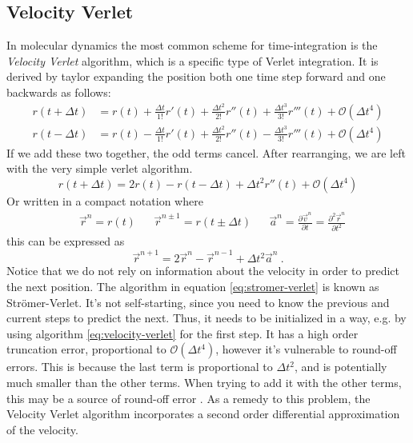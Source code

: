 \documentclass[twoside,english]{uiofysmaster}
\begin{document}
\subsection*{Velocity Verlet}
In molecular dynamics the most common scheme for time-integration is the \textit{Velocity Verlet} algorithm, which is a specific type of Verlet integration.
It is derived by taylor expanding the position both one time step forward and one backwards as follows: 
\begin{align}
	r(t+\Delta t) &= r(t) + \frac{\Delta t}{1!}r'(t) + \frac{\Delta t^2}{2!}r''(t) + \frac{\Delta t^3}{3!}r'''(t) + \mathcal{O}(\Delta t^4)\\[1ex]
	r(t-\Delta t) &= r(t) - \frac{\Delta t}{1!}r'(t) + \frac{\Delta t^2}{2!}r''(t) - \frac{\Delta t^3}{3!}r'''(t) + \mathcal{O}(\Delta t^4)
\end{align}
If we add these two together, the odd terms cancel. 
After rearranging, we are left with the very simple verlet algorithm. 
\begin{equation}
r(t+\Delta t) = 2r(t) - r(t-\Delta t) + \Delta t^2r''(t) + \mathcal{O}(\Delta t^4)
\end{equation}
Or written in a compact notation where
\begin{align}
	&\vec{r}^n = r(t)& &\vec{r}^{n\pm 1} = r(t\pm \Delta t)&  &\vec{a}^n = \frac{\partial \vec{v}^n}{\partial t} = \frac{\partial^2 \vec{r}^n}{\partial t ^2}
\end{align}
this can be expressed as
\begin{equation}\label{eq:stromer-verlet}
\vec{r}^{n+1} = 2\vec{r}^n - \vec{r}^{n-1} + \Delta t^2\vec{a}^n ~.
\end{equation}
Notice that we do not rely on information about the velocity in order to predict the next position. 
The algorithm in equation \eqref{eq:stromer-verlet} is known as Strömer-Verlet. 
It's not self-starting, since you need to know the previous and current steps to predict the next. 
Thus, it needs to be initialized in a way, e.g. by using algorithm \eqref{eq:velocity-verlet} for the first step. 
It has a high order truncation error, proportional to $\mathcal{O}(\Delta t^4)$, however it's vulnerable to round-off errors. 
This is because the last term is proportional to $\Delta t^2$, and is potentially much smaller than the other terms.
When trying to add it with the other terms, this may be a source of round-off error \cite{MATINF1100}. 
As a remedy to this problem, the Velocity Verlet algorithm incorporates a second order differential approximation of the velocity.
\end{document}

